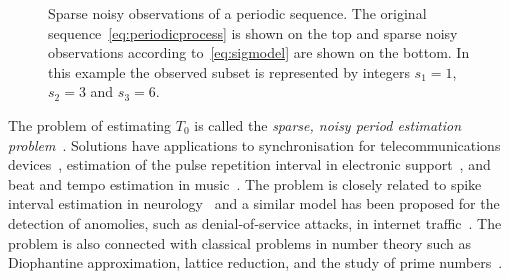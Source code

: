 \documentclass[10pt,twocolumn,twoside]{IEEEtran}
\begin{document}
{
\def\vertgap{2}
\def\ph{0.4}
\def\T{1.1}
\newcommand{\raxis}{\draw[->] (-0.25,0) -- (8,0) node[above] {$\reals$}; \draw (0,-0.06)-- node[below] {$0$} (0,0.06) }
\newcommand{\pulse}[1]{ \draw[->,>=latex] (#1,0) -- (#1,1) }
\newcommand{\pulsewithnode}[2]{ \draw[->,>=latex] (#1,0) -- node[right] {#2} (#1,1) }
\begin{figure}[t]
	\centering
{}
		\caption{Sparse noisy observations of a periodic sequence.  The original sequence~\eqref{eq:periodicprocess} is shown on the top and sparse noisy observations according to~\eqref{eq:sigmodel} are shown on the bottom.  In this example the observed subset is represented by integers $s_1=1$, $s_2=3$ and $s_3=6$.}
		\label{fig_stat_model}
\end{figure}
}

The problem of estimating $T_0$ is called the \emph{sparse, noisy period estimation problem}~\cite{Clarkson2007,McKilliam2007}.  Solutions have applications to synchronisation for telecommunications devices~\cite{Fogel1988,Fogel1989_bit_synch_zero_crossings,Sidiropoulos2005,5621928}, estimation of the pulse repetition interval in electronic support~\cite{EltonGray_puilse_train_rader_1994,Gray_more_pri_1994,Clarkson_thesis,clarkson_estimate_period_pulse_train_1996,Hauochan_pri_2012}, and beat and tempo estimation in music~\cite{dixon_beat_extraction_2001}.  The problem is closely related to spike interval estimation in neurology~\cite{Arnett_neuro_pri_1976,Brillinger_spike_trains_1988,Rossoni200630} and a similar model has been proposed for the detection of anomolies, such as denial-of-service attacks, in internet traffic~\cite{He_detecting_periodic_patterns_in_internet_2006,5585849,5947313}.  The problem is also connected with classical problems in number theory such as Diophantine approximation, lattice reduction, and the study of prime numbers~\cite{Cassels_geom_numbers_1997,490557,Clarkson_thesis,Lenstra1982,Wubben_2011,Casey1995,726812,CaseySadler_primes_2013}.
\end{document}
